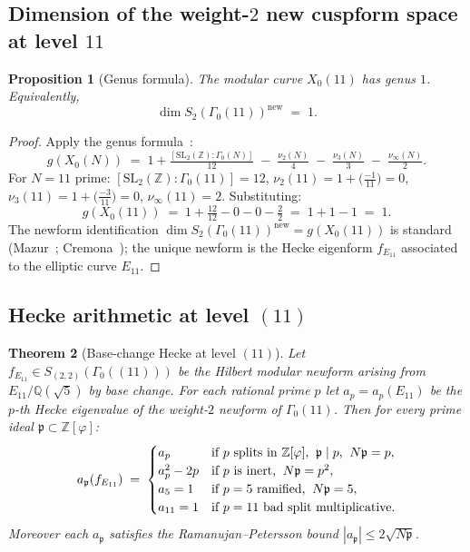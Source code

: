 \documentclass[11pt,a4paper]{article}
\theoremstyle{plain}
\newtheorem{theorem}{Theorem}[section]
\newtheorem{proposition}[theorem]{Proposition}
\theoremstyle{definition}
\theoremstyle{remark}
\numberwithin{equation}{section}
\providecommand{\Zp}{\ensuremath{\mathbb{Z}[\varphi]}}
\providecommand{\Qp}{\ensuremath{\mathbb{Q}(\sqrt{5})}}
\begin{document}
\subsection{Dimension of the weight-$2$ new cuspform space at level $11$}

\begin{proposition}[Genus formula]\label{thm:genus-x011}
The modular curve $X_{0}(11)$ has genus $1$.  Equivalently,
\[
  \dim S_{2}(\Gamma_{0}(11))^{\mathrm{new}} \;=\; 1.
\]
\end{proposition}

\begin{proof}
Apply the genus formula~\cite[Thm.~3.1.1]{DiamondShurman}:
\[
  g(X_{0}(N)) \;=\; 1 + \tfrac{[\mathrm{SL}_{2}(\mathbb Z):\Gamma_{0}(N)]}{12}
  \;-\;\tfrac{\nu_{2}(N)}{4}\;-\;\tfrac{\nu_{3}(N)}{3}\;-\;\tfrac{\nu_{\infty}(N)}{2}.
\]
For $N=11$ prime: $[\mathrm{SL}_{2}(\mathbb Z):\Gamma_{0}(11)] = 12$,
$\nu_{2}(11)=1+\bigl(\tfrac{-1}{11}\bigr)=0$,
$\nu_{3}(11)=1+\bigl(\tfrac{-3}{11}\bigr)=0$,
$\nu_{\infty}(11)=2$.  Substituting:
\[
  g(X_{0}(11)) \;=\; 1 + \tfrac{12}{12} - 0 - 0 - \tfrac{2}{2}
  \;=\; 1+1-1 \;=\; 1.
\]
The newform identification $\dim S_{2}(\Gamma_{0}(11))^{\mathrm{new}}=g(X_{0}(11))$
is standard (Mazur~\cite{Mazur}; Cremona~\cite{CremonaLMFDB}); the unique
newform is the Hecke eigenform $f_{E_{11}}$ associated to the elliptic
curve $E_{11}$.
\end{proof}

\subsection{Hecke arithmetic at level $(11)$}

\begin{theorem}[Base-change Hecke at level $(11)$]\label{thm:hecke-basechange}
Let $f_{E_{11}}\in S_{(2,2)}(\Gamma_{0}((11)))$ be the Hilbert modular newform
arising from $E_{11}/\Qp$ by base change.  For each rational prime $p$ let
$a_{p} = a_{p}(E_{11})$ be the $p$-th Hecke eigenvalue of the weight-$2$
newform of $\Gamma_{0}(11)$.  Then for every prime ideal $\mathfrak p\subset\Zp$:
\[
  a_{\mathfrak p}(f_{E_{11}}) \;=\;
  \begin{cases}
    a_{p} & \text{if $p$ splits in $\Zp$,\;\;$\mathfrak p\mid p$,\;\;$N\mathfrak p=p$},\\
    a_{p}^{2}-2p & \text{if $p$ is inert,\;\;$N\mathfrak p=p^{2}$},\\
    a_{5}=1 & \text{if $p=5$ ramified,\;\;$N\mathfrak p=5$},\\
    a_{11}=1 & \text{if $p=11$ bad split multiplicative}.
  \end{cases}
\]
Moreover each $a_{\mathfrak p}$ satisfies the Ramanujan--Petersson bound
$|a_{\mathfrak p}|\le 2\sqrt{N\mathfrak p}$.
\end{theorem}
\end{document}
